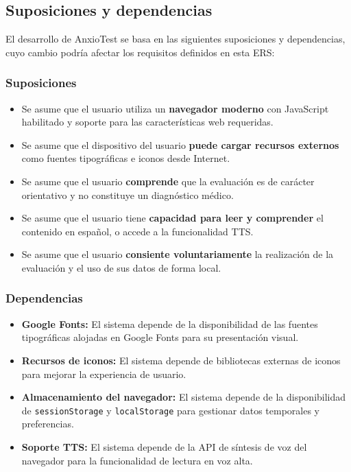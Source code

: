 \subsection{Suposiciones y dependencias}
\label{sec:suposiciones_dependencias}

El desarrollo de AnxioTest se basa en las siguientes suposiciones y dependencias, cuyo cambio podría afectar los requisitos definidos en esta ERS:

\subsubsection{Suposiciones}

\begin{itemize}
  \item Se asume que el usuario utiliza un \textbf{navegador moderno} con JavaScript habilitado y soporte para las características web requeridas.
  \item Se asume que el dispositivo del usuario \textbf{puede cargar recursos externos} como fuentes tipográficas e iconos desde Internet.
  \item Se asume que el usuario \textbf{comprende} que la evaluación es de carácter orientativo y no constituye un diagnóstico médico.
  \item Se asume que el usuario tiene \textbf{capacidad para leer y comprender} el contenido en español, o accede a la funcionalidad TTS.
  \item Se asume que el usuario \textbf{consiente voluntariamente} la realización de la evaluación y el uso de sus datos de forma local.
\end{itemize}

\subsubsection{Dependencias}

\begin{itemize}
  \item \textbf{Google Fonts:} El sistema depende de la disponibilidad de las fuentes tipográficas alojadas en Google Fonts para su presentación visual.
  \item \textbf{Recursos de iconos:} El sistema depende de bibliotecas externas de iconos para mejorar la experiencia de usuario.
  \item \textbf{Almacenamiento del navegador:} El sistema depende de la disponibilidad de \texttt{sessionStorage} y \texttt{localStorage} para gestionar datos temporales y preferencias.
  \item \textbf{Soporte TTS:} El sistema depende de la API de síntesis de voz del navegador para la funcionalidad de lectura en voz alta.
\end{itemize}

